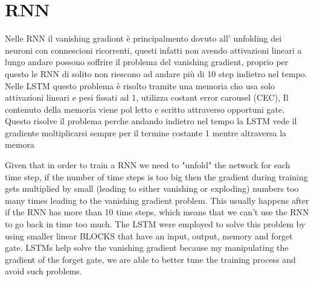 
\section{RNN}


\begin{box-stud}
    Nelle RNN il vanishing gradiont è principalmento dovuto all' unfolding dei neuroni con connescioni ricorrenti, questi infatti non avendo attivazioni lineari a lungo andare possono soffrire il problema del vanishing gradient, proprio per questo le RNN di solito non riescono ad andare più di 10 step indietro nel tempo. Nelle LSTM questo problema è risolto tramite una memoria cho usa solo attivazioni lineari e pesi fissati ad 1, utilizza costant error carousel (CEC), Il contenuto della memoria viene pol letto e scritto attraverso opportuni gate. Questo risolve il problema perche andando indietro nel tempo la LSTM vede il gradiente moltiplicarsi sempre per il termine costante 1 mentre altraversa la memora
\end{box-stud}

\begin{box-stud}
    Given that in order to train a RNN we need to "unfold" the network for each time step, if the number of time steps is too big then the gradient during training gets multiplied by small (leading to either vanishing or exploding) numbers too many times leading to the vanishing gradient problem. This usually happens after if the RNN has more than 10 time steps, which means that we can't use the RNN to go back in time too much. The LSTM were employed to solve this problem by using smaller linear BLOCKS that have an input, output, memory and forget gate. LSTMs help solve the vanishing gradient because my manipulating the gradient of the forget gate, we are able to better tune the training process and avoid such problems.
\end{box-stud}




